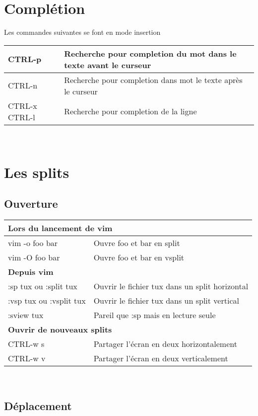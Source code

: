 \documentclass{article}
\begin{document}
\section{Complétion}
Les commandes suivantes se font en mode insertion\\


\begin{tabular}{|p{3cm}| l| }
    \hline
CTRL-p & Recherche pour completion du mot dans le texte avant le curseur \\ \hline
CTRL-n & Recherche pour completion dans mot le texte après le curseur \\ \hline
CTRL-x CTRL-l &	Recherche pour completion de la ligne \\ \hline
\end{tabular}\\


\section{Les splits}
\subsection{Ouverture}
\begin{tabular}{|p{4cm}| l| }\hline
\multicolumn{2}{|l|}{\textbf{Lors du lancement de vim }} \\ \hline
    vim -o foo bar & Ouvre foo et bar en split\\ \hline
    vim -O foo bar & Ouvre foo et bar en vsplit\\ \hline
\multicolumn{2}{|l|}{\textbf{Depuis vim}}\\ \hline
:sp tux ou :split tux & Ouvrir le fichier tux dans un split horizontal \\ \hline
    :vsp tux ou :vsplit tux & Ouvrir le fichier tux dans un split vertical \\ \hline
    :sview tux & Pareil que :sp mais en lecture seule \\ \hline
\multicolumn{2}{|l|}{\textbf{Ouvrir de nouveaux splits }} \\ \hline
CTRL-w s & Partager l'écran en deux horizontalement \\ \hline
    CTRL-w v & Partager l'écran en deux verticalement \\ \hline
\end{tabular}\\

\subsection{Déplacement}
\end{document}
